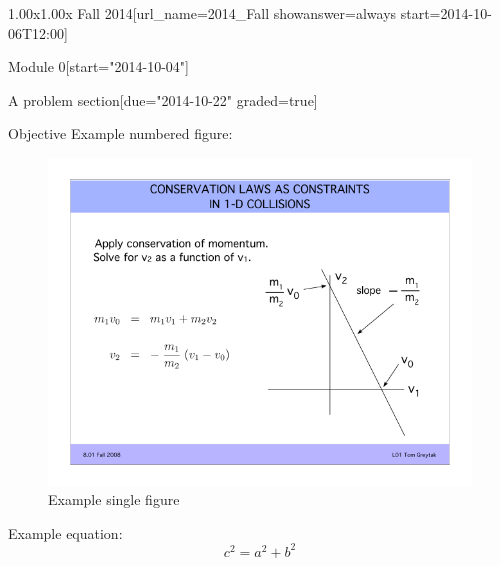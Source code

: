 \documentclass[12pt]{article}
\begin{document}
\begin{edXcourse}{1.00x}{1.00x Fall 2014}[url_name=2014_Fall showanswer=always start=2014-10-06T12:00]
\begin{edXchapter*}{Module 0}[start="2014-10-04"]
\begin{edXsequential}{A problem section}[due="2014-10-22" graded=true]
\begin{edXtext}{Objective}
Example numbered figure: %
\begin{figure}
  \begin{center}
    \includegraphics{example-image.png}
    \caption{Example single figure}

    \label{fig:single}

  \end{center}
\end{figure}

Example equation:
\begin{equation}
  c^2 = a^2 + b^2
  \label{eq:pythagorean}
\end{equation}


\end{edXtext}
\end{edXsequential}
\end{edXchapter*}
\end{edXcourse}
\end{document}
